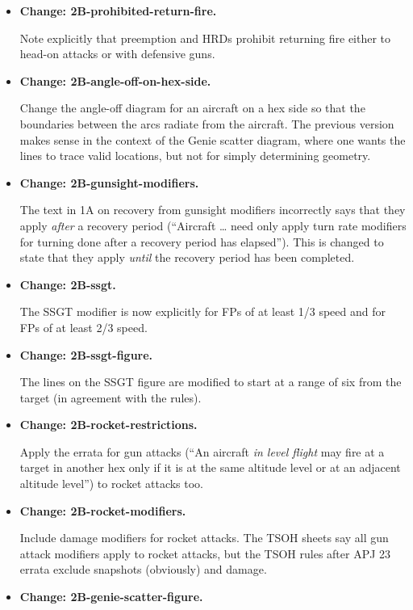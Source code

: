 \documentclass{report}
\newcommand{\changetag}[1]{\textbf{Change: #1.}\par}
\begin{document}
\begin{itemize}
    \item\changetag{2B-prohibited-return-fire}

        Note explicitly that preemption and HRDs prohibit returning fire either to head-on attacks or with defensive guns.

    \item\changetag{2B-angle-off-on-hex-side}

        Change the angle-off diagram for an aircraft on a hex side so that the boundaries between the arcs radiate from the aircraft. The previous version makes sense in the context of the Genie scatter diagram, where one wants the lines to trace valid locations, but not for simply determining geometry.

    \item\changetag{2B-gunsight-modifiers}

        The text in 1A on recovery from gunsight modifiers incorrectly says that they apply \emph{after} a recovery period (“Aircraft {\ldots} need only apply turn rate modifiers for turning done after a recovery period has elapsed”). This is changed to state that they apply \emph{until} the recovery period has been completed.

    \item\changetag{2B-ssgt}

        The SSGT modifier is now explicitly  for FPs of at least 1/3 speed and  for FPs of at least 2/3 speed.

    \item\changetag{2B-ssgt-figure}

        The lines on the SSGT figure are modified to start at a range of six from the target (in agreement with the rules).

    \item\changetag{2B-rocket-restrictions}

        Apply the errata for gun attacks (“An aircraft \emph{in level flight} may fire at a target in another hex only if it is at the same altitude level or at an adjacent altitude level”) to rocket attacks too.

    \item\changetag{2B-rocket-modifiers}

        Include damage modifiers for rocket attacks. The TSOH sheets say all gun attack modifiers apply to rocket attacks, but the TSOH rules after APJ 23 errata exclude snapshots (obviously) and damage.

    \item\changetag{2B-genie-scatter-figure}


\end{itemize}
\end{document}
